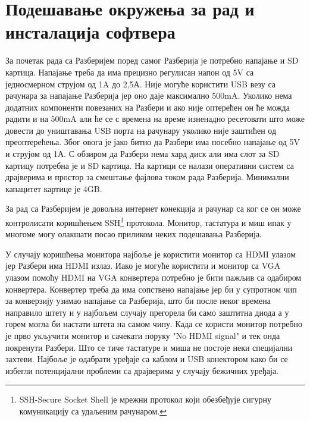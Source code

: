\documentclass[12pt,oneside]{memoir}
\theoremstyle{remark}
\begin{document}
\section{Подешавање окружења за рад и инсталација софтвера}
За почетак рада са Разберијем поред самог Разберија је потребно напајање и SD картица. Напајање треба да има прецизно регулисан напон од 5V са једносмерном струјом од 1A до 2,5А. Није могуће користити USB везу са рачунара за напајање Разберија јер оно даје максимално 500mA. Уколико нема додатних компоненти повезаних на Разбери и ако није оптерећен он ће можда радити и на 500mA али ће се с времена на време изненадно ресетовати што може довести до уништавања USB порта на рачунару уколико није заштићен од преоптерећења. Због овога је јако битно да Разбери има посебно напајање од 5V и струјом од 1А. С обзиром да Разбери нема хард диск али има слот за SD картицу потребна је и SD картица. На картици се налази оперативни систем са драјверима и простор за смештање фајлова током рада Разберија. Минимални капацитет картице је 4GB.

За рад са Разберијем је довољна интернет конекција и рачунар са ког се он може контролисати коришћењем SSH\footnote{SSH-Secure Socket Shell је мрежни протокол који обезбеђује сигурну комуникацију са удаљеним рачунаром.} протокола. Монитор, тастатура и миш ипак у многоме могу олакшати посао приликом неких подешавања Разберија.

У случају коришћења монитора најбоље је користити монитор са HDMI улазом јер Разбери има HDMI излаз. Иако је могуће користити и монитор са VGA улазом помоћу HDMI на VGA конвертера потребно је бити пажљив са одабиром конвертера. Конвертер треба да има сопствено напајање јер би у супротном чип за конверзију узимао напајање са Разберија, што би после неког времена направило штету и у најбољем случају прегорела би само заштитна диода а у горем могла би настати штета на самом чипу. Када се користи монитор потребно је прво укључити монитор и сачекати поруку "No HDMI signal" и тек онда покренути Разбери. Што се тиче тастатуре и миша не постоје неки специјални захтеви. Најбоље је одабрати уређаје са каблом и USB конектором како би се избегли потенцијални проблеми са драјверима у случају бежичних уређаја. 
\end{document}
